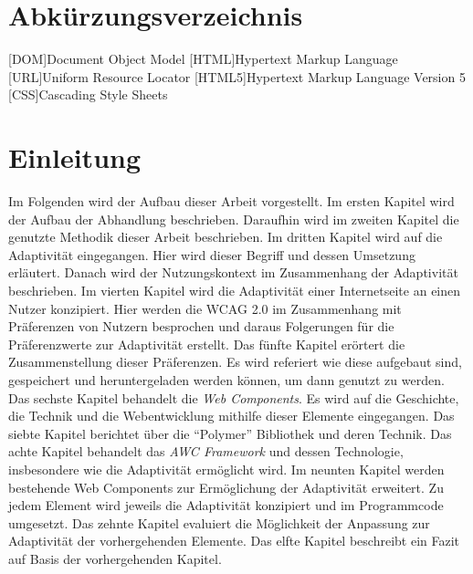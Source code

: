 \documentclass[12pt, paper=a4, bibtotoc, toc=listof, headsepline=true, numbers=endperiod]{scrreprt}
\newcommand{\listoflistings}{\listof{listing}{Listing Verzeichnis}}
\begin{document}
\listoflistings
\listoffigures

\chapter*{Abkürzungsverzeichnis}
\begin{acronym}
	[DOM]{Document Object Model}
	[HTML]{Hypertext Markup Language}
	[URL]{Uniform Resource Locator}
	[HTML5]{Hypertext Markup Language Version 5}
	[CSS]{Cascading Style Sheets}
\end{acronym}

\tableofcontents



\chapter{Einleitung}
Im Folgenden wird der Aufbau dieser Arbeit vorgestellt. Im ersten Kapitel wird der Aufbau der Abhandlung beschrieben. Daraufhin wird im zweiten Kapitel die genutzte Methodik dieser Arbeit beschrieben. Im dritten Kapitel wird auf die Adaptivität eingegangen. Hier wird dieser Begriff und dessen Umsetzung erläutert. Danach wird der Nutzungskontext im Zusammenhang der Adaptivität beschrieben. Im vierten Kapitel wird die Adaptivität einer Internetseite an einen Nutzer konzipiert. Hier werden die \ac{WCAG 2.0} im Zusammenhang mit Präferenzen von Nutzern besprochen und daraus Folgerungen für die Präferenzwerte zur Adaptivität erstellt. Das fünfte Kapitel erörtert die Zusammenstellung dieser Präferenzen. Es wird referiert wie diese aufgebaut sind, gespeichert und heruntergeladen werden können, um dann genutzt zu werden. Das sechste Kapitel behandelt die \emph{Web Components}. Es wird auf die Geschichte, die Technik und die Webentwicklung mithilfe dieser Elemente eingegangen. Das siebte Kapitel berichtet über die \enquote{Polymer} Bibliothek und deren Technik. Das achte Kapitel behandelt das \emph{AWC Framework} und dessen Technologie, insbesondere wie die Adaptivität ermöglicht wird. Im neunten Kapitel werden bestehende Web Components zur Ermöglichung der Adaptivität erweitert. Zu jedem Element wird jeweils die Adaptivität konzipiert und im Programmcode umgesetzt. Das zehnte Kapitel evaluiert die Möglichkeit der Anpassung zur Adaptivität der vorhergehenden Elemente. Das elfte Kapitel beschreibt ein Fazit auf Basis der vorhergehenden Kapitel. 
\end{document}
